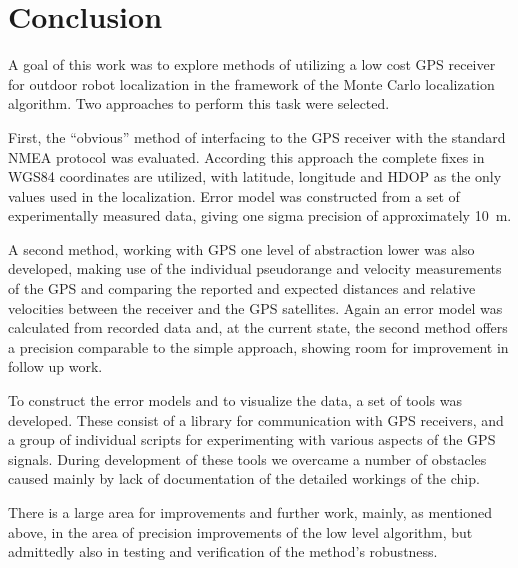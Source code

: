 \chapter{Conclusion}
\label{chap:conclusion}

A goal of this work was to explore methods of utilizing a low cost GPS receiver
for outdoor robot localization in the framework of the Monte Carlo localization algorithm.
Two approaches to perform this task were selected.

First, the \enquote{obvious} method of interfacing to the GPS receiver with the
standard NMEA protocol was evaluated.
According this approach the complete fixes in WGS84 coordinates are utilized,
with latitude, longitude and HDOP as the only values used in the localization.
Error model was constructed from a set of experimentally measured data,
giving one sigma precision of approximately \SI{10}{\meter}.

A second method, working with GPS one level of abstraction lower was also developed,
making use of the individual pseudorange and velocity measurements
of the GPS and comparing the reported and expected distances and relative velocities
between the receiver and the GPS satellites.
Again an error model was calculated from recorded data and,
at the current state, the second method offers a precision comparable to the simple
approach, showing room for improvement in follow up work.

To construct the error models and to visualize the data, a set of tools was developed.
These consist of a library for communication with \sirf GPS receivers,
and a group of individual scripts for experimenting with various aspects of the GPS signals.
During development of these tools we overcame a number of obstacles caused mainly
by lack of documentation of the detailed workings of the \sirf chip.

There is a large area for improvements and further work, mainly, as mentioned
above, in the area of precision improvements of the low level algorithm,
but admittedly also in testing and verification of the method's robustness.
